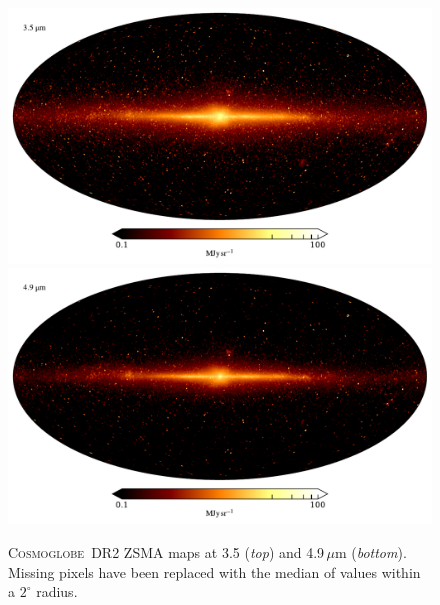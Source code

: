 \documentclass{aa}
\newcommand{\cosmoglobe}{\textsc{Cosmoglobe}}
\begin{document}
\begin{figure}
	\centering
	\includegraphics[width=\linewidth]{figs/map_03.pdf}\\
	\includegraphics[width=\linewidth]{figs/map_04.pdf}
	\caption{\cosmoglobe\ DR2 ZSMA maps at 3.5 (\emph{top}) and
          4.9$\,\mu$m (\emph{bottom}). Missing pixels have been replaced with
          the median of values within a $2^\circ$ radius.}
	\label{fig:freqmaps3_4}
\end{figure}
\end{document}
